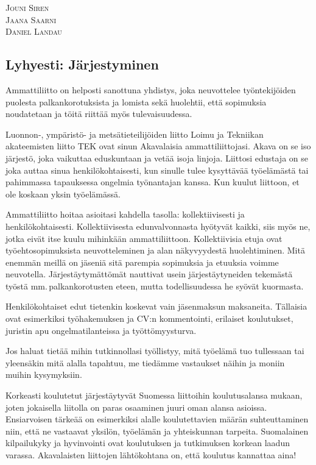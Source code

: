 \documentclass[a5paper, 8pt, twocolumn]{book} %
\numberwithin{equation}{section}
\begin{document}
\vspace{0.5cm}\noindent
\textsc{Jouni Siren}\\
\textsc{Jaana Saarni}\\
\textsc{Daniel Landau}

\subsection*{Lyhyesti: Järjestyminen}
Ammattiliitto on helposti sanottuna
yhdistys, joka neuvottelee työntekijöiden
puolesta palkankorotuksista ja lomista sekä
huolehtii, että sopimuksia noudatetaan ja
töitä riittää myös tulevaisuudessa.

Luonnon-, ympäristö- ja metsä\-tieteilijöiden liitto Loimu ja Tekniikan akateemisten liitto
TEK ovat sinun Akavalaisia ammattiliittojasi.
Akava on se iso järjestö, joka vaikuttaa
eduskuntaan ja vetää isoja linjoja. Liittosi
edustaja on se joka auttaa sinua henkilökohtaisesti,
kun sinulle tulee kysyttävää
työelämästä tai pahimmassa tapauksessa
ongelmia työnantajan kanssa. Kun kuulut
liittoon, et ole koskaan yksin työelämässä.

Ammattiliitto hoitaa asioitasi kahdella
tasolla: kollektiivisesti ja henkilökohtaisesti.
Kollektiivisesta edunvalvonnasta
hyötyvät kaikki, siis myös ne, jotka eivät
itse kuulu mihinkään ammattiliittoon. Kollektiivisia
etuja ovat työehtosopimuksista
neuvotteleminen ja alan näkyvyydestä huolehtiminen.
Mitä enemmän meillä on jäseniä
sitä parempia sopimuksia ja etuuksia
voimme neuvotella. Järjestäytymättömät
nauttivat usein järjestäytyneiden tekemästä
työstä mm.\,palkankorotusten eteen, mutta
todellisuudessa he syövät kuormasta.

Henkilökohtaiset edut tietenkin koskevat
vain jäsenmaksun maksaneita. Tällaisia
ovat esimerkiksi työhakemuksen ja CV:n
kommentointi, erilaiset koulutukset, juristin
apu ongelmatilanteissa ja työttömyysturva.

Jos haluat tietää mihin tutkinnollasi
työllistyy, mitä työelämä tuo tullessaan tai
yleensäkin mitä alalla tapahtuu, me tiedämme
vastaukset näihin ja moniin muihin kysymyksiin.

Korkeasti koulutetut järjestäytyvät Suomessa
liittoihin koulutusalansa mukaan,
joten jokaisella liitolla on paras osaaminen
juuri oman alansa asioissa. Ensiarvoisen
tärkeää on esimerkiksi alalle koulutettavien
määrän suhteuttaminen niin, että ne vastaavat
yksilön, työelämän ja yhteiskunnan
tarpeita. Suomalainen kilpailukyky ja hyvinvointi
ovat koulutuksen ja tutkimuksen
korkean laadun varassa. Akavalaisten liittojen
lähtökohtana on, että koulutus kannattaa
aina!
\end{document}
